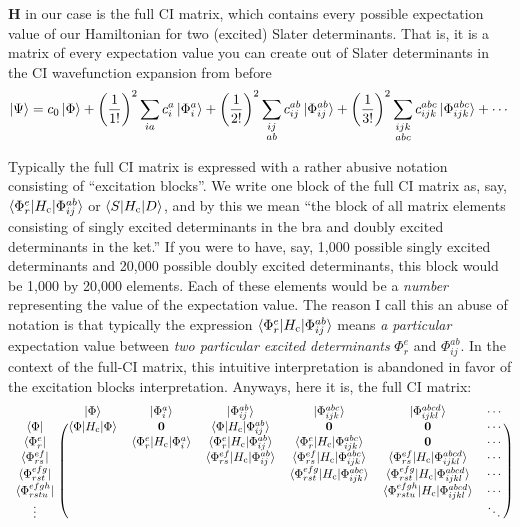 \documentclass{article}
\newcommand{\Hc}{H_{\mathrm{c}}}
\begin{document}
$\mathbf{H}$ in our case is the full CI matrix, which contains every possible expectation value of our Hamiltonian 
for two (excited) Slater determinants. 
That is, it is a matrix of every expectation value you can create out of Slater determinants in the CI wavefunction expansion from before
\[ \ket{\Psi} = c_0 \ket{\Phi} + \left(\frac{1}{1!}\right)^2 \sum_{ia} c_i^a \ket{\Phi_i^a} +  \left(\frac{1}{2!}\right)^2\sum_{ \substack{ij \\ ab}} c_{ij}^{ab} \ket{\Phi_{ij}^{ab}} + \left(\frac{1}{3!}\right)^2 \sum_{ \substack{ijk \\ abc}} c_{ijk}^{abc} \ket{\Phi_{ijk}^{abc}} + \cdots \]

Typically the full CI matrix is expressed with a rather abusive notation consisting of ``excitation blocks''. 
We write one block of the full CI matrix as, say, $\braket{\Phi_{r}^{e}|\Hc|\Phi_{ij}^{ab}}$ or $\braket{S|\Hc|D}$, and 
by this we mean ``the block of all matrix elements consisting of singly excited determinants in the bra and doubly excited determinants in the ket.'' 
If you were to have, say, 1,000 possible singly excited determinants and 20,000 possible doubly excited determinants,
this block would be 1,000 by 20,000 elements. Each of these elements would be a \textit{number} representing the value of the expectation value.
The reason I call this an abuse of notation is that typically the expression $\braket{\Phi_{r}^{e}|\Hc|\Phi_{ij}^{ab}}$ means \textit{a particular} 
expectation value between \textit{two particular excited determinants} $\Phi_{r}^{e}$ and  $\Phi_{ij}^{ab}$.
In the context of the full-CI matrix, this intuitive interpretation is abandoned in favor of the excitation blocks interpretation.
Anyways, here it is, the full CI matrix:
\[
\begin{blockarray}{ccccccc}
 & 	\ket{\Phi} & \ket{\Phi_{i}^{a}} & \ket{\Phi_{ij}^{ab}}  &\ket{\Phi_{ijk}^{abc}} & \ket{\Phi_{ijkl}^{abcd}} & \cdots \\
\begin{block}{c(cccccc)}
\bra{\Phi}               & \braket{\Phi|\Hc|\Phi} &  \mathbf{0} &  \braket{\Phi|\Hc|\Phi_{ij}^{ab}} & \mathbf{0} & \mathbf{0} & \cdots  \\
\bra{\Phi_{r}^{e}}       &   &  \braket{\Phi_{r}^{e}|\Hc|\Phi_{i}^{a}} &  \braket{\Phi_{r}^{e}|\Hc|\Phi_{ij}^{ab}} & \braket{\Phi_{r}^{e}|\Hc|\Phi_{ijk}^{abc}} & \mathbf{0} & \cdots \\
\bra{\Phi_{rs}^{ef}}     &   &   &  \braket{\Phi_{rs}^{ef}|\Hc|\Phi_{ij}^{ab}} & \braket{\Phi_{rs}^{ef}|\Hc|\Phi_{ijk}^{abc}}  & \braket{\Phi_{rs}^{ef}|\Hc|\Phi_{ijkl}^{abcd}}  & \cdots \\
\bra{\Phi_{rst}^{efg}}   &   &   &   & \braket{\Phi_{rst}^{efg}|\Hc|\Phi_{ijk}^{abc}} & \braket{\Phi_{rst}^{efg}|\Hc|\Phi_{ijkl}^{abcd}}  & \cdots \\
\bra{\Phi_{rstu}^{efgh}} &   &   &   &   &  \braket{\Phi_{rstu}^{efgh}|\Hc|\Phi_{ijkl}^{abcd}}  & \cdots \\
\vdots                   &   &   &   &   &   & \ddots \\
\end{block}
\end{blockarray}
\]
\end{document}
